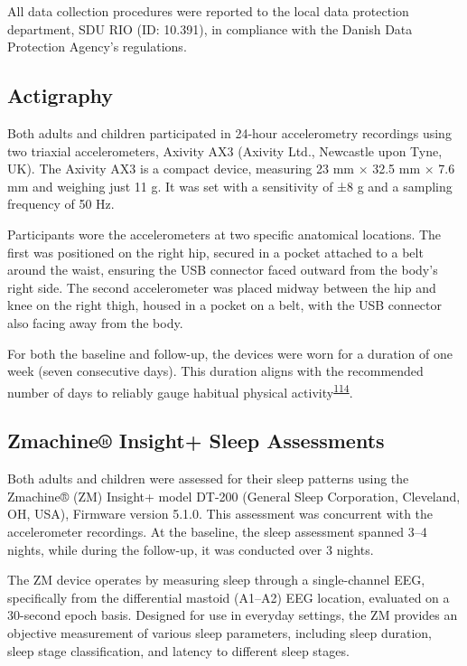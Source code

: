 \documentclass[
  10pt,
]{scrbook}
\begin{document}
All data collection procedures were reported to the local data
protection department, SDU RIO (ID: 10.391), in compliance with the
Danish Data Protection Agency's regulations.

\hypertarget{actigraphy}{%
\subsection{Actigraphy}\label{actigraphy}}

Both adults and children participated in 24-hour accelerometry
recordings using two triaxial accelerometers, Axivity AX3 (Axivity Ltd.,
Newcastle upon Tyne, UK). The Axivity AX3 is a compact device, measuring
23 mm × 32.5 mm × 7.6 mm and weighing just 11 g. It was set with a
sensitivity of ±8 g and a sampling frequency of 50 Hz.

Participants wore the accelerometers at two specific anatomical
locations. The first was positioned on the right hip, secured in a
pocket attached to a belt around the waist, ensuring the USB connector
faced outward from the body's right side. The second accelerometer was
placed midway between the hip and knee on the right thigh, housed in a
pocket on a belt, with the USB connector also facing away from the body.

For both the baseline and follow-up, the devices were worn for a
duration of one week (seven consecutive days). This duration aligns with
the recommended number of days to reliably gauge habitual physical
activity\textsuperscript{\protect\hyperlink{ref-jaeschke_variability_2018}{114}}.

\hypertarget{zmachine-insight-sleep-assessments}{%
\subsection{Zmachine® Insight+ Sleep
Assessments}\label{zmachine-insight-sleep-assessments}}

Both adults and children were assessed for their sleep patterns using
the Zmachine® (ZM) Insight+ model DT-200 (General Sleep Corporation,
Cleveland, OH, USA), Firmware version 5.1.0. This assessment was
concurrent with the accelerometer recordings. At the baseline, the sleep
assessment spanned 3--4 nights, while during the follow-up, it was
conducted over 3 nights.

The ZM device operates by measuring sleep through a single-channel EEG,
specifically from the differential mastoid (A1--A2) EEG location,
evaluated on a 30-second epoch basis. Designed for use in everyday
settings, the ZM provides an objective measurement of various sleep
parameters, including sleep duration, sleep stage classification, and
latency to different sleep stages.
\end{document}
